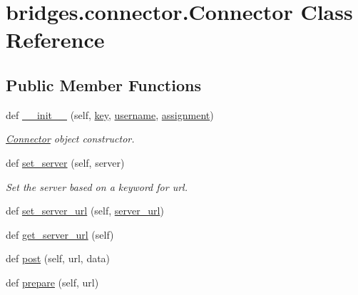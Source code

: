 \hypertarget{classbridges_1_1connector_1_1_connector}{}\section{bridges.\+connector.\+Connector Class Reference}
\label{classbridges_1_1connector_1_1_connector}
\subsection*{Public Member Functions}
\begin{DoxyCompactItemize}
\item 
def \hyperlink{classbridges_1_1connector_1_1_connector_a2d5af7535b60c92433f2333951b7ea69}{\+\_\+\+\_\+init\+\_\+\+\_\+} (self, \hyperlink{classbridges_1_1connector_1_1_connector_a3b577c34402fea1910f56fd9cac51c07}{key}, \hyperlink{classbridges_1_1connector_1_1_connector_af2f4f996092cf63a5e7940ca93a2c6b7}{username}, \hyperlink{classbridges_1_1connector_1_1_connector_a2df020c062b6224d4eeb2c5407c02656}{assignment})
\begin{DoxyCompactList}\small\item\em \hyperlink{classbridges_1_1connector_1_1_connector}{Connector} object constructor. \end{DoxyCompactList}\item 
def \hyperlink{classbridges_1_1connector_1_1_connector_aabe66803d7701015138288c5ceeba81f}{set\+\_\+server} (self, server)
\begin{DoxyCompactList}\small\item\em Set the server based on a keyword for url. \end{DoxyCompactList}\item 
def \hyperlink{classbridges_1_1connector_1_1_connector_a6cfa754618584132754cea9a8bde5282}{set\+\_\+server\+\_\+url} (self, \hyperlink{classbridges_1_1connector_1_1_connector_abcc06e345e43916cf975eb200187d911}{server\+\_\+url})
\item 
def \hyperlink{classbridges_1_1connector_1_1_connector_a1db4c60fd9c2817c2ff237bdfb98e4a9}{get\+\_\+server\+\_\+url} (self)
\item 
def \hyperlink{classbridges_1_1connector_1_1_connector_abfc36138302d5ec49219cb3ccf48439a}{post} (self, url, data)
\item 
def \hyperlink{classbridges_1_1connector_1_1_connector_afcd39dd1f2f37a945e16254e0fed178b}{prepare} (self, url)
\end{DoxyCompactItemize}
